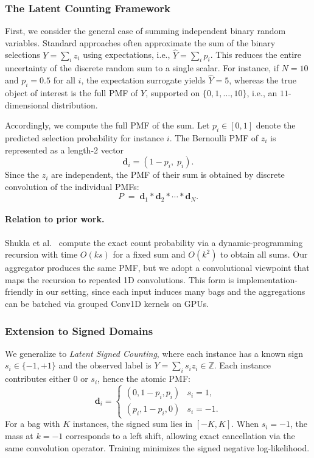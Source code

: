\documentclass{article}
\theoremstyle{plain}
\theoremstyle{definition}
\theoremstyle{remark}
\begin{document}
\subsubsection{The Latent Counting Framework}
\label{sec:universal_framework}

First, we consider the general case of summing independent binary random variables. Standard approaches often approximate the sum of the binary selections $Y=\sum_i z_i$ using expectations, i.e., $\hat{Y}=\sum_i p_i$. This reduces the entire uncertainty of the discrete random sum to a single scalar. For instance, if $N=10$ and $p_i=0.5$ for all $i$, the expectation surrogate yields $\hat{Y}=5$, whereas the true object of interest is the full PMF of $Y$, supported on $\{0,1,\dots,10\}$, i.e., an $11$-dimensional distribution.

Accordingly, we compute the full PMF of the sum. 
Let $p_i\in[0,1]$ denote the predicted selection probability for instance $i$.
The Bernoulli PMF of $z_i$ is represented as a length-2 vector
\[
\mathbf d_i = (1-p_i,\; p_i).
\]
Since the $z_i$ are independent, the PMF of their sum is obtained by discrete convolution of the individual PMFs:
\[
P \;=\; \mathbf d_1 * \mathbf d_2 * \cdots * \mathbf d_N.
\]


\paragraph{Relation to prior work.}
Shukla et al.~\cite{shukla2023unified} compute the exact count probability via a dynamic-programming recursion with time $O(ks)$ for a fixed sum and $O(k^2)$ to obtain all sums. 
Our aggregator produces the same PMF, but we adopt a convolutional viewpoint that maps the recursion to repeated 1D convolutions. 
This form is implementation-friendly in our setting, since each input induces many bags and the aggregations can be batched via grouped Conv1D kernels on GPUs.



	\subsubsection{Extension to Signed Domains}
	We generalize to \textit{Latent Signed Counting}, where each instance has a known sign $s_i\in\{-1,+1\}$ and the observed label is
	$Y=\sum_i s_i z_i\in\mathbb{Z}$.
	Each instance contributes either $0$ or $s_i$, hence the atomic PMF:
	\[
		\mathbf d_i=
		\begin{cases}
			(0,1-p_i, p_i) & s_i=1,\\
			(p_i, 1-p_i , 0)   & s_i=-1.
		\end{cases}
	\]
	For a bag with $K$ instances, the signed sum lies in $[-K,K]$.
	When $s_i=-1$, the mass at $k=-1$ corresponds to a left shift, allowing exact cancellation via the same convolution operator.
	Training minimizes the signed negative log-likelihood.
	
\end{document}
